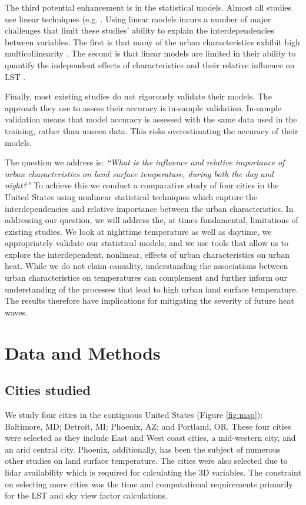 \documentclass[review]{elsarticle}
\begin{document}
The third potential enhancement is in the statistical models.
Almost all studies use linear techniques (e.g. \cite{Li2017-yl, Peng2012-iy, Wicki2017-fv,Zhou2014-wc,Peng2018-cp,Echevarria_Icaza2016-fr,Chun2017-mm,Chun2018-so,Wang2019-tree,Wang2019-water}.
Using linear models incurs a number of major challenges that limit these studies' ability to explain the interdependencies between variables. 
The first is that many of the urban characteristics exhibit high multicollinearity \cite{Zhou2014-wc}.
The second is that linear models are limited in their ability to quantify the independent effects of characteristics and their relative influence on LST \cite{Peng2018-cp, Zhou2014-wc}.

Finally, most existing studies do not rigorously validate their models.
The approach they use to assess their accuracy is in-sample validation.
In-sample validation means that model accuracy is assessed with the same data used in the training, rather than unseen data. 
This risks overestimating the accuracy of their models.

The question we address is: \textit{``What is the influence and relative importance of urban characteristics on land surface temperature, during both the day and night?''}
To achieve this we conduct a comparative study of four cities in the United States using nonlinear statistical techniques which capture the interdependencies and relative importance between the urban characteristics.
In addressing our question, we will address the, at times fundamental, limitations of existing studies.
We look at nighttime temperature as well as daytime, we appropriately validate our statistical models, and we use tools that allow us to explore the interdependent, nonlinear, effects of urban characteristics on urban heat.
While we do not claim causality, understanding the associations between urban characteristics on temperatures can complement and further inform our understanding of the processes that lead to high urban land surface temperature.
The results therefore have implications for mitigating the severity of future heat waves.

\section{Data and Methods}
\subsection{Cities studied}

We study four cities in the contiguous United States (Figure \ref{fig:map}): Baltimore, MD; Detroit, MI; Phoenix, AZ; and Portland, OR. These four cities were selected as they include East and West coast cities, a mid-western city, and an arid central city. Phoenix, additionally, has been the subject of numerous other studies on land surface temperature. The cities were also selected due to lidar availability which is required for calculating the 3D variables. The constraint on selecting more cities was the time and computational requirements primarily for the LST and sky view factor calculations. 
\end{document}
